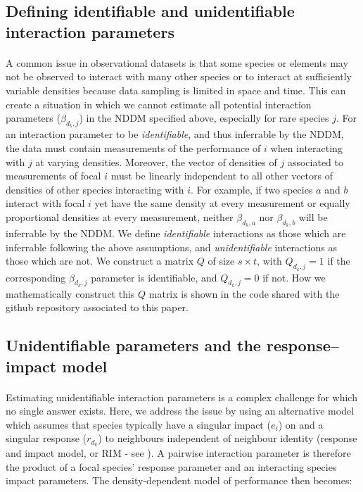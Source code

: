 \documentclass[a4,12pt]{article}
\begin{document}
    \subsection{Defining identifiable and unidentifiable interaction parameters}
    \label{meth:id_params}

    \paragraph{}
    A common issue in observational datasets is that some species or elements may not be observed to interact with many other species or to interact at sufficiently variable densities because data sampling is limited in space and time. This can create a situation in which we cannot estimate all potential interaction parameters ($\beta_{d_k, j}$) in the NDDM specified above, especially for rare species $j$. For an interaction parameter to be \textit{identifiable}, and thus inferrable by the NDDM, the data must contain measurements of the performance of $i$ when interacting with $j$ at varying densities. Moreover, the vector of densities of $j$ associated to measurements of focal $i$ must be linearly independent to all other vectors of densities of other species interacting with $i$. For example, if two species $a$ and $b$ interact with focal $i$ yet have the same density at every measurement or equally proportional densities at every measurement, neither $\beta_{d_k, a}$ nor $\beta_{d_k, b}$ will be inferrable by the NDDM. We define \textit{identifiable} interactions as those which are inferrable following the above assumptions, and \textit{unidentifiable} interactions as those which are not. We construct a matrix $Q$ of size $s \times t$, with $Q_{d_k, j} = 1$ if the corresponding $\beta_{d_k, j}$ parameter is identifiable, and $Q_{d_k, j} = 0$ if not. How we mathematically construct this $Q$ matrix is shown in the code shared with the github repository associated to this paper.
    
    \subsection{Unidentifiable parameters and the response--impact model}
    \label{meth:rim}

    \paragraph{}
    Estimating unidentifiable interaction parameters is a complex challenge for which no single answer exists. Here, we address the issue by using an alternative model which assumes that species typically have a singular impact ($e_i$) on and a singular response ($r_{d_k}$) to neighbours independent of neighbour identity (response and impact model, or RIM - see \cite{Godoy2014b}). A pairwise interaction parameter is therefore the product of a focal species' response parameter and an interacting species impact parameters. The density-dependent model of performance then becomes:
\end{document}
